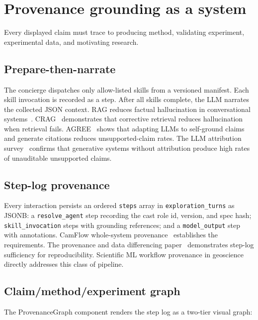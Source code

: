\section{Provenance grounding as a system}

Every displayed claim must trace to producing method, validating experiment, experimental data, and motivating research.

\subsection{Prepare-then-narrate}

The concierge dispatches only allow-listed skills from a versioned manifest. Each skill invocation is recorded as a step. After all skills complete, the LLM narrates the collected JSON context. RAG reduces factual hallucination in conversational systems~\cite{arxiv210407567}. CRAG~\cite{arxiv240115884} demonstrates that corrective retrieval reduces hallucination when retrieval fails. AGREE~\cite{arxiv231109533} shows that adapting LLMs to self-ground claims and generate citations reduces unsupported-claim rates. The LLM attribution survey~\cite{arxiv231103731} confirms that generative systems without attribution produce high rates of unauditable unsupported claims.

\subsection{Step-log provenance}

Every interaction persists an ordered \texttt{steps} array in \texttt{exploration\_turns} as JSONB: a \texttt{resolve\_agent} step recording the cast role id, version, and spec hash; \texttt{skill\_invocation} steps with grounding references; and a \texttt{model\_output} step with annotations. CamFlow whole-system provenance~\cite{arxiv171105296} establishes the requirements. The provenance and data differencing paper~\cite{arxiv14060905} demonstrates step-log sufficiency for reproducibility. Scientific ML workflow provenance in geoscience~\cite{arxiv201000330} directly addresses this class of pipeline.

\subsection{Claim/method/experiment graph}

The ProvenanceGraph component renders the step log as a two-tier visual graph:

